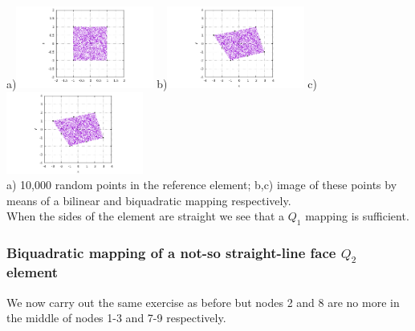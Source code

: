 \begin{center}
a)\includegraphics[width=4.5cm]{images/mappings/biquadratic/rs.pdf}
b)\includegraphics[width=4.5cm]{images/mappings/biquadratic/xyQ1.pdf}
c)\includegraphics[width=4.5cm]{images/mappings/biquadratic/xyQ2.pdf}\\
{\captionfont a) 10,000 random points in the reference element; b,c) image of these points
by means of a bilinear and biquadratic mapping respectively.\\ When the sides of the element
are straight we see that a $Q_1$ mapping is sufficient.}
\end{center}

\subsubsection{Biquadratic mapping of a not-so straight-line face $Q_2$ element }

We now carry out the same exercise as before but nodes 2 and 8 are no more 
in the middle of nodes 1-3 and 7-9 respectively.

